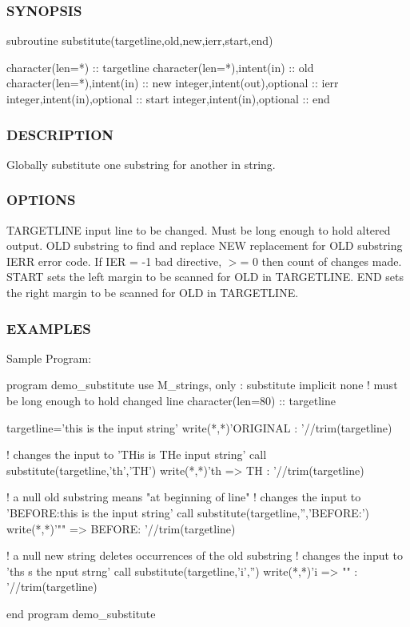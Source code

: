 \subsubsection*{S\+Y\+N\+O\+P\+S\+IS}

\begin{DoxyVerb}subroutine substitute(targetline,old,new,ierr,start,end)

 character(len=*)              :: targetline
 character(len=*),intent(in)   :: old
 character(len=*),intent(in)   :: new
 integer,intent(out),optional  :: ierr
 integer,intent(in),optional   :: start
 integer,intent(in),optional   :: end
\end{DoxyVerb}
 \subsubsection*{D\+E\+S\+C\+R\+I\+P\+T\+I\+ON}

Globally substitute one substring for another in string.

\subsubsection*{O\+P\+T\+I\+O\+NS}

T\+A\+R\+G\+E\+T\+L\+I\+NE input line to be changed. Must be long enough to hold altered output. O\+LD substring to find and replace N\+EW replacement for O\+LD substring I\+E\+RR error code. If I\+ER = -\/1 bad directive, $>$= 0 then count of changes made. S\+T\+A\+RT sets the left margin to be scanned for O\+LD in T\+A\+R\+G\+E\+T\+L\+I\+NE. E\+ND sets the right margin to be scanned for O\+LD in T\+A\+R\+G\+E\+T\+L\+I\+NE.

\subsubsection*{E\+X\+A\+M\+P\+L\+ES}

Sample Program\+: \begin{DoxyVerb}program demo_substitute
use M_strings, only : substitute
implicit none
! must be long enough to hold changed line
character(len=80) :: targetline

targetline='this is the input string'
write(*,*)'ORIGINAL    : '//trim(targetline)

! changes the input to 'THis is THe input string'
call substitute(targetline,'th','TH')
write(*,*)'th => TH    : '//trim(targetline)

! a null old substring means "at beginning of line"
! changes the input to 'BEFORE:this is the input string'
call substitute(targetline,'','BEFORE:')
write(*,*)'"" => BEFORE: '//trim(targetline)

! a null new string deletes occurrences of the old substring
! changes the input to 'ths s the nput strng'
call substitute(targetline,'i','')
write(*,*)'i => ""     : '//trim(targetline)

end program demo_substitute
\end{DoxyVerb}


